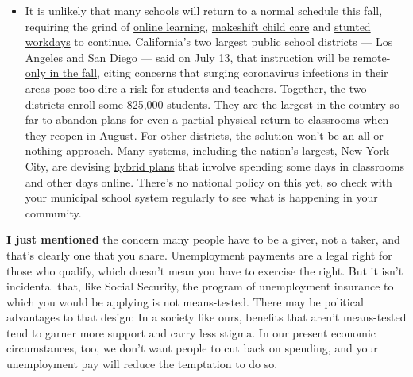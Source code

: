 \begin{itemize}
  \begin{itemize}
  \tightlist
  \item
    It is unlikely that many schools will return to a normal schedule
    this fall, requiring the grind of
    \href{https://www.nytimes.com/2020/06/05/us/coronavirus-education-lost-learning.html?action=click\&pgtype=Article\&state=default\&region=MAIN_CONTENT_3\&context=storylines_faq}{online
    learning},
    \href{https://www.nytimes.com/2020/05/29/us/coronavirus-child-care-centers.html?action=click\&pgtype=Article\&state=default\&region=MAIN_CONTENT_3\&context=storylines_faq}{makeshift
    child care} and
    \href{https://www.nytimes.com/2020/06/03/business/economy/coronavirus-working-women.html?action=click\&pgtype=Article\&state=default\&region=MAIN_CONTENT_3\&context=storylines_faq}{stunted
    workdays} to continue. California's two largest public school
    districts --- Los Angeles and San Diego --- said on July 13, that
    \href{https://www.nytimes.com/2020/07/13/us/lausd-san-diego-school-reopening.html?action=click\&pgtype=Article\&state=default\&region=MAIN_CONTENT_3\&context=storylines_faq}{instruction
    will be remote-only in the fall}, citing concerns that surging
    coronavirus infections in their areas pose too dire a risk for
    students and teachers. Together, the two districts enroll some
    825,000 students. They are the largest in the country so far to
    abandon plans for even a partial physical return to classrooms when
    they reopen in August. For other districts, the solution won't be an
    all-or-nothing approach.
    \href{https://bioethics.jhu.edu/research-and-outreach/projects/eschool-initiative/school-policy-tracker/}{Many
    systems}, including the nation's largest, New York City, are
    devising
    \href{https://www.nytimes.com/2020/06/26/us/coronavirus-schools-reopen-fall.html?action=click\&pgtype=Article\&state=default\&region=MAIN_CONTENT_3\&context=storylines_faq}{hybrid
    plans} that involve spending some days in classrooms and other days
    online. There's no national policy on this yet, so check with your
    municipal school system regularly to see what is happening in your
    community.
  \end{itemize}
\end{itemize}

\textbf{I just mentioned} the concern many people have to be a giver,
not a taker, and that's clearly one that you share. Unemployment
payments are a legal right for those who qualify, which doesn't mean you
have to exercise the right. But it isn't incidental that, like Social
Security, the program of unemployment insurance to which you would be
applying is not means-tested. There may be political advantages to that
design: In a society like ours, benefits that aren't means-tested tend
to garner more support and carry less stigma. In our present economic
circumstances, too, we don't want people to cut back on spending, and
your unemployment pay will reduce the temptation to do so.

